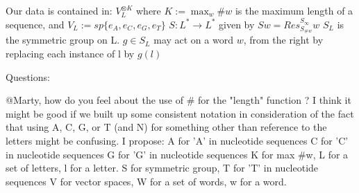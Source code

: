 \documentclass[aoas]{imsart}
\begin{document}
Our data is contained in:
$V_L^{\otimes K} $ where $K := \max_w \#w $ is the maximum length of a sequence, and $V_L := sp\{e_A, e_C, e_G,e_T\} $ 
$S:L^* \rightarrow L^* $ given by $Sw = Res^{S_\infty}_{S_{\#w} }w$
$S_L $ is the symmetric group on L. $g \in S_L$ may act on a word $w$, from the right by replacing each instance of l by $g(l)$ 


Questions:
\item @Marty, how do you feel about the use of $\#$ for the "length" function ? I think it might be good if we built up some consistent notation in consideration of the fact that using A, C, G, or T (and N) for something other than reference to the letters might  be confusing. I propose:
A for 'A' in nucleotide sequences
C for 'C' in nucleotide sequences
G for 'G' in nucleotide sequences
K for max #w,
L for a set of letters, l for a letter.
S for symmetric group,
T for 'T' in nucleotide sequences
V for vector spaces,
W for a set of words, w for a word.





\begin{thebibliography}{}
\end{thebibliography}
\end{document}
